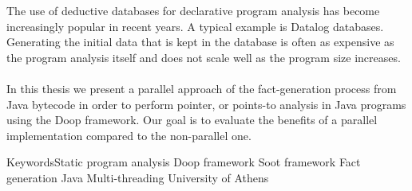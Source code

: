 \documentclass{dithesis}
\renewcommand{\university}{National and Kapodistrian University of Athens}
\renewcommand{\school}{School of Science}
\renewcommand{\department}{Department of Informatics and Telecommunications}
\renewcommand{\thesisplace}{Athens}
\renewcommand{\thesisdate}{July 2016}
\renewcommand{\thesislabel}{Undergraduate Thesis}
\renewcommand{\supervisorlabel}{Supervisors}
\renewcommand{\idlabel}{R.N.}
\begin{document}
\begin{otherlanguage}{english}
\maketitle
\setcounter{page}{3}
\end{otherlanguage}


\begin{otherlanguage}{greek}
\renewcommand{\university}{Εθνικό και Καποδιστριακό Πανεπιστήμιο Αθηνών}
\renewcommand{\school}{Σχολή Θετικών Επιστημών}
\renewcommand{\department}{Τμήμα Πληροφορικής και Τηλεπικοινωνιών}
\renewcommand{\thesisplace}{Αθήνα}
\renewcommand{\thesisdate}{Ιούλιος 2016}
\renewcommand{\thesislabel}{Πτυχιακή Εργασία}
\renewcommand{\supervisorlabel}{Επιβλέποντες}
\renewcommand{\idlabel}{Α.Μ.}
\let\thesupervisorslist\undefined
{}
\maketitlesecond
\end{otherlanguage}



\begin{thesisabstract}[ABSTRACT]
	The use of deductive databases for declarative program analysis has become increasingly popular in recent years. A typical example is Datalog databases. Generating the initial data that is kept in the database is often as expensive as the program analysis itself and does not scale well as the program size increases.\\
	\\
    In this thesis we present a parallel approach of the fact-generation process from Java bytecode in order to perform pointer, or points-to analysis in Java programs using the Doop framework. Our goal is to evaluate the benefits of a parallel implementation compared to the non-parallel one.

                {Keywords}{Static program analysis}
                            {Doop framework}
                            {Soot framework}
                            {Fact generation}
                            {Java Multi-threading}
                            {University of Athens}
\end{thesisabstract}
\end{document}
